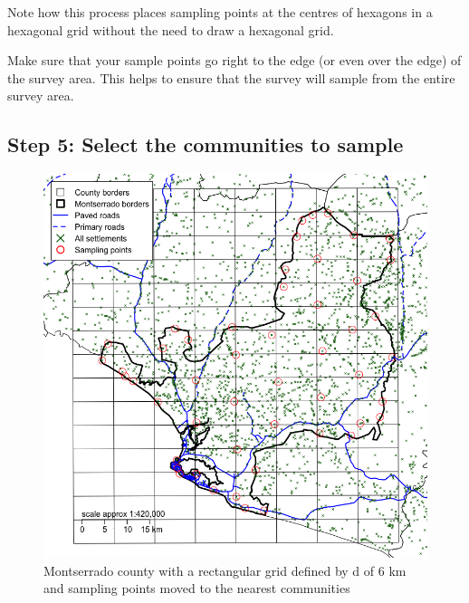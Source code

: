 \documentclass[12pt,a4paper]{book}
\theoremstyle{definition}
\theoremstyle{definition}
\theoremstyle{definition}
\theoremstyle{remark}
\begin{document}
Note how this process places sampling points at the centres of hexagons
in a hexagonal grid without the need to draw a hexagonal grid.

Make sure that your sample points go right to the edge (or even over the
edge) of the survey area. This helps to ensure that the survey will
sample from the entire survey area.

\newpage

\hypertarget{step-5-select-the-communities-to-sample}{%
\subsection{Step 5: Select the communities to
sample}\label{step-5-select-the-communities-to-sample}}

\begin{figure}[H]

{\centering \includegraphics{figures/grid3-1} 

}

\caption{Montserrado county with a rectangular grid defined by d of 6 km and sampling points moved to the nearest communities}\label{fig:grid3}
\end{figure}

\newpage
\end{document}

